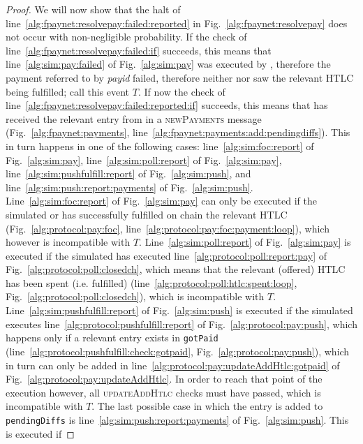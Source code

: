 \begin{proof}
  We will now show that the halt of
  line~\ref{alg:fpaynet:resolvepay:failed:reported} in
  Fig.~\ref{alg:fpaynet:resolvepay} does not occur with non-negligible
  probability. If the check of line~\ref{alg:fpaynet:resolvepay:failed:if}
  succeeds, this means that line~\ref{alg:sim:pay:failed} of
  Fig.~\ref{alg:sim:pay} was executed by \simulator{}, therefore the payment
  referred to by \textit{payid} failed, therefore neither \alice{} nor \bob{}
  saw the relevant HTLC being fulfilled; call this event $T$. If now the check
  of line~\ref{alg:fpaynet:resolvepay:failed:reported:if} succeeds, this means
  that \fpaynet{} has received the relevant entry from \simulator{} in a
  \textsc{newPayments} message (Fig.~\ref{alg:fpaynet:payments},
  line~\ref{alg:fpaynet:payments:add:pendingdiffs}). This in turn happens in one
  of the following cases: line~\ref{alg:sim:foc:report} of
  Fig.~\ref{alg:sim:pay}, line~\ref{alg:sim:poll:report} of
  Fig.~\ref{alg:sim:pay}, line~\ref{alg:sim:pushfulfill:report} of
  Fig.~\ref{alg:sim:push}, and line~\ref{alg:sim:push:report:payments} of
  Fig.~\ref{alg:sim:push}. Line~\ref{alg:sim:foc:report} of
  Fig.~\ref{alg:sim:pay} can only be executed if the simulated \alice{} or
  \bob{} has successfully fulfilled on chain the relevant HTLC
  (Fig.~\ref{alg:protocol:pay:foc},
  line~\ref{alg:protocol:pay:foc:payment:loop}), which however is incompatible
  with $T$. Line~\ref{alg:sim:poll:report} of Fig.~\ref{alg:sim:pay} is executed
  if the simulated \alice{} has executed line~\ref{alg:protocol:poll:report:pay}
  of Fig.~\ref{alg:protocol:poll:closedch}, which means that the relevant
  (offered) HTLC has been spent (i.e. fulfilled)
  (line~\ref{alg:protocol:poll:htlc:spent:loop},
  Fig.~\ref{alg:protocol:poll:closedch}), which is incompatible with $T$.
  Line~\ref{alg:sim:pushfulfill:report} of Fig.~\ref{alg:sim:push} is executed
  if the simulated \bob{} executes line~\ref{alg:protocol:pushfulfill:report} of
  Fig.~\ref{alg:protocol:pay:push}, which happens only if a relevant entry
  exists in \texttt{gotPaid} (line~\ref{alg:protocol:pushfulfill:check:gotpaid},
  Fig.~\ref{alg:protocol:pay:push}), which in turn can only be added in
  line~\ref{alg:protocol:pay:updateAddHtlc:gotpaid} of
  Fig.~\ref{alg:protocol:pay:updateAddHtlc}. In order to reach that point of the
  execution however, all \textsc{updateAddHtlc} checks must have passed, which
  is incompatible with $T$. The last possible case in which the entry is added
  to \texttt{pendingDiffs} is line~\ref{alg:sim:push:report:payments} of
  Fig.~\ref{alg:sim:push}. This is executed if

\end{proof}
